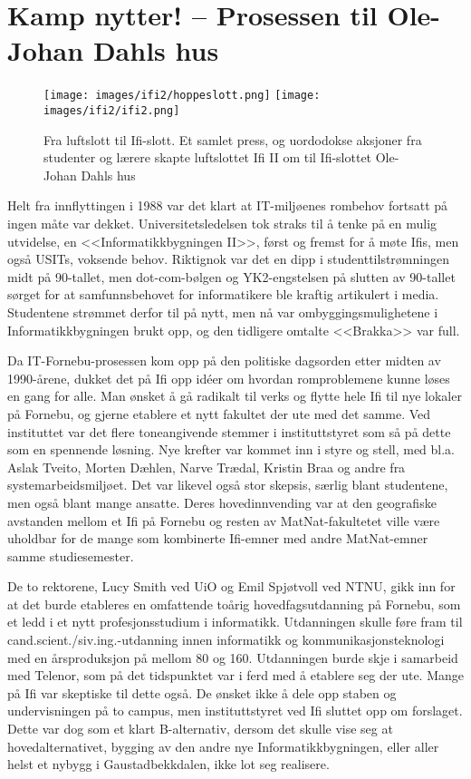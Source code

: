 \chapter[Ifi 2]{Kamp nytter! -- Prosessen til Ole-Johan Dahls hus}

\label{chap:ifi2}

\author{Skrevet av Narve Trædal}

\begin{figure}
	\texttt{[image: images/ifi2/hoppeslott.png]}
	\texttt{[image: images/ifi2/ifi2.png]}
	\caption{Fra luftslott til Ifi-slott. Et samlet press, og uordodokse aksjoner fra studenter og lærere skapte luftslottet Ifi II om til Ifi-slottet Ole-Johan Dahls hus}
\end{figure}

Helt fra innflyttingen i 1988 var det klart at IT-miljøenes rombehov fortsatt på ingen måte var dekket. Universitetsledelsen tok straks til å tenke på en mulig utvidelse, en <<Informatikkbygningen II>>, først og fremst for å møte Ifis, men også USITs, voksende behov. Riktignok var det en dipp i studenttilstrømningen midt på 90-tallet, men dot-com-bølgen og YK2-engstelsen på slutten av 90-tallet sørget for at samfunnsbehovet for informatikere ble kraftig artikulert i media. Studentene strømmet derfor til på nytt, men nå var ombyggingsmulighetene i Informatikkbygningen brukt opp, og den tidligere omtalte <<Brakka>> var full.

Da IT-Fornebu-prosessen kom opp på den politiske dagsorden etter midten av 1990-årene, dukket det på Ifi opp idéer om hvordan romproblemene kunne løses en gang for alle. Man ønsket å gå radikalt til verks og flytte hele Ifi til nye lokaler på Fornebu, og gjerne etablere et nytt fakultet der ute med det samme. Ved instituttet var det flere toneangivende stemmer i instituttstyret som så på dette som en spennende løsning. Nye krefter var kommet inn i styre og stell, med bl.a. Aslak Tveito, Morten Dæhlen, Narve Trædal, Kristin Braa og andre fra systemarbeidsmiljøet. Det var likevel også stor skepsis, særlig blant studentene, men også blant mange ansatte. Deres hovedinnvending var at den geografiske avstanden mellom et Ifi på Fornebu og resten av MatNat-fakultetet ville være uholdbar for de mange som kombinerte Ifi-emner med andre MatNat-emner samme studiesemester.

De to rektorene, Lucy Smith ved UiO og Emil Spjøtvoll ved NTNU, gikk inn for at det burde etableres en omfattende toårig hovedfagsutdanning på Fornebu, som et ledd i et nytt profesjonsstudium i informatikk. Utdanningen skulle føre fram til cand.scient.\slash siv.ing.-utdanning innen informatikk og
kommunikasjonsteknologi med en årsproduksjon på mellom 80 og 160. Utdanningen burde skje i samarbeid med Telenor, som på det tidspunktet var i ferd med å etablere seg der ute. Mange på Ifi var skeptiske til dette også. De ønsket ikke å dele opp staben og undervisningen på to campus, men instituttstyret ved Ifi sluttet opp om forslaget. Dette var dog som et klart B-alternativ, dersom det skulle vise seg at hovedalternativet, bygging av den andre nye Informatikkbygningen, eller aller helst et nybygg i Gaustadbekkdalen, ikke lot seg realisere.

